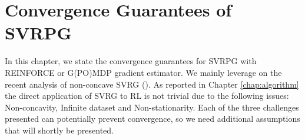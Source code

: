 \chapter{Convergence Guarantees of SVRPG} \label{chap:convergence}
In this chapter, we state the convergence guarantees for \acs{SVRPG}  with REINFORCE or G(PO)MDP gradient estimator.
We mainly leverage on the recent analysis of non-concave \acs{SVRG} (\cite{reddi2016stochastic,allen2016variance}).
As reported in Chapter \ref{chap:algorithm} the direct application of \acs{SVRG} to \acs{RL} is not trivial due to the following issues: Non-concavity, Infinite dataset and Non-stationarity.
Each of the three challenges presented can potentially prevent convergence, so we need additional assumptions that will shortly be presented.
